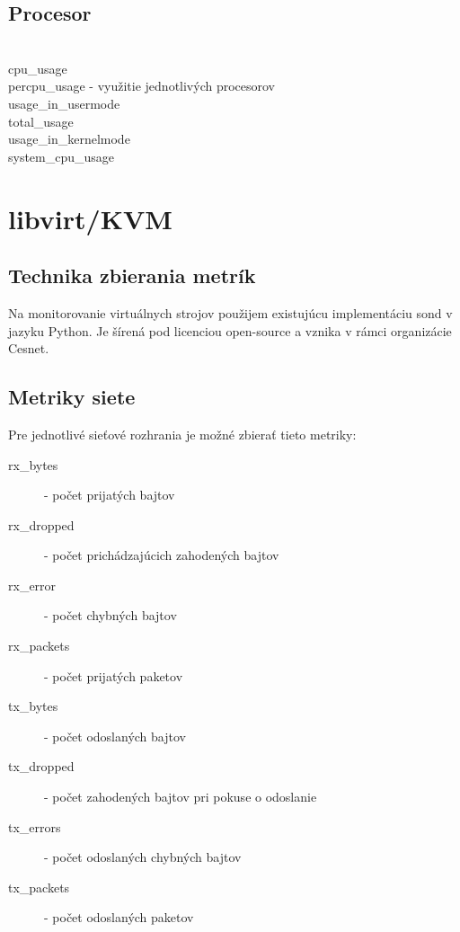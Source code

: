 \documentclass[11pt,final,oneside]{fithesis}
\begin{document}
\subsection{Procesor}
\\        cpu\_usage 
\\           percpu\_usage - využitie jednotlivých procesorov
\\           usage\_in\_usermode
\\           total\_usage
\\           usage\_in\_kernelmode
\\        system\_cpu\_usage

\section{libvirt/KVM}
\subsection{Technika zbierania metrík}
Na monitorovanie virtuálnych strojov použijem existujúcu implementáciu sond v jazyku Python. Je šírená pod licenciou open-source a vznika v rámci organizácie Cesnet. 

\subsection{Metriky siete}
Pre jednotlivé sieťové rozhrania je možné zbierať tieto metriky:
\begin{description}
\item[rx_bytes] - počet prijatých bajtov
\item[rx_dropped] - počet prichádzajúcich zahodených bajtov
\item[rx_error] - počet chybných bajtov
\item[rx_packets] - počet prijatých paketov
\item[tx_bytes] - počet odoslaných bajtov
\item[tx_dropped] - počet zahodených bajtov pri pokuse o odoslanie
\item[tx_errors] - počet odoslaných chybných bajtov
\item[tx_packets] - počet odoslaných paketov
\end{description}
\end{document}
